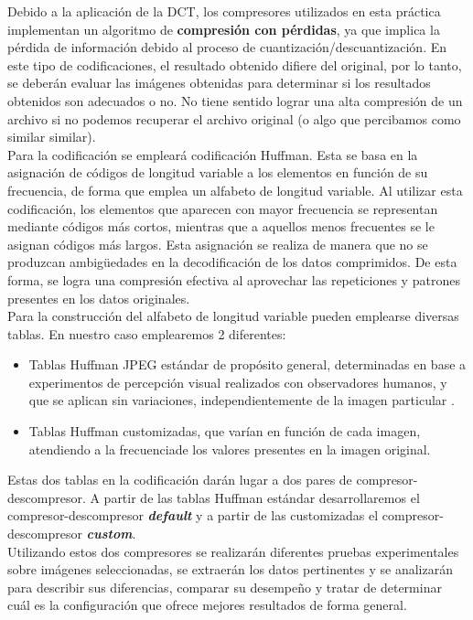 \documentclass[12pt,a4paper]{article}
\begin{document}
Debido a la aplicación de la DCT, los compresores utilizados en esta práctica implementan un algoritmo de \textbf{compresión con pérdidas}, ya que implica la pérdida de información debido al proceso de cuantización/descuantización. En este tipo de codificaciones, el resultado obtenido difiere del original, por lo tanto, se deberán evaluar las imágenes obtenidas para determinar si los resultados obtenidos son adecuados o no. No tiene sentido lograr una alta compresión de un archivo si no podemos recuperar el archivo original (o algo que percibamos como similar similar).\\

Para la codificación se empleará codificación Huffman. Esta se basa en la asignación de códigos de longitud variable a los elementos en función de su frecuencia, de forma que emplea un alfabeto de longitud variable. Al utilizar esta codificación, los elementos que aparecen con mayor frecuencia se representan mediante códigos más cortos, mientras que a aquellos menos frecuentes se le asignan códigos más largos. Esta asignación se realiza de manera que no se produzcan ambigüedades en la decodificación de los datos comprimidos. De esta forma, se logra una compresión efectiva al aprovechar las repeticiones y patrones presentes en los datos originales.\\

Para la construcción del alfabeto de longitud variable pueden emplearse diversas tablas. En nuestro caso emplearemos 2 diferentes:
\begin{itemize}
    \item Tablas Huffman JPEG estándar de propósito general, determinadas en base a experimentos de percepción visual realizados con observadores humanos, y que se aplican sin variaciones, independientemente de la imagen particular \cite{ITU-T81}.
    \item Tablas Huffman customizadas, que varían en función de cada imagen, atendiendo a la frecuenciade los valores presentes en la imagen original.
\end{itemize}

Estas dos tablas en la codificación darán lugar a dos pares de compresor-descompresor. A partir de las tablas Huffman estándar desarrollaremos el compresor-descompresor \textbf{\textit{default}} y a partir de las customizadas el compresor-descompresor \textbf{\textit{custom}}.\\

Utilizando estos dos compresores se realizarán diferentes pruebas experimentales sobre imágenes seleccionadas, se extraerán los datos pertinentes y se analizarán para describir sus diferencias, comparar su desempeño y tratar de determinar cuál es la configuración que ofrece mejores resultados de forma general.
\end{document}
